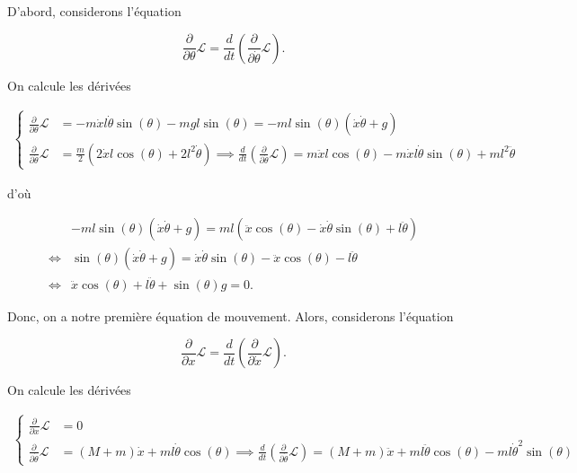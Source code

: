 \documentclass[french]{article}
\begin{document}
	D'abord, considerons l'équation
	
	\begin{equation}
		\frac{\partial}{\partial \theta} \mathcal{L} = \frac{d}{dt}\left( \frac{\partial}{\partial \dot{\theta}} \mathcal{L} \right).
	\end{equation}
	
	On calcule les dérivées
	
	\begin{align}
		\begin{cases}
		\frac{\partial}{\partial \theta} \mathcal{L} &= -m\dot{x} l \dot{\theta} \sin(\theta) - m g l \sin(\theta) = -ml\sin(\theta)(\dot{x} \dot{\theta} + g)\\
		\frac{\partial}{\partial \dot{\theta}} \mathcal{L} &= \frac{m}{2} (2\dot{x}l\cos(\theta) + 2l^2\dot{\theta}) \implies \frac{d}{dt}\left( \frac{\partial}{\partial \dot{\theta}} \mathcal{L} \right) = m\ddot{x}l\cos(\theta) - m\dot{x}l\dot{\theta}\sin(\theta) + ml^2\ddot{\theta}
		\end{cases}
	\end{align}
	
	d'où
	
	\begin{align}
	&-ml \sin(\theta)(\dot{x}\dot{\theta} + g) = ml(\ddot{x} \cos(\theta) - \dot{x}\dot{\theta} \sin(\theta) + l\ddot{\theta})\\
	\iff &\sin(\theta)(\dot{x}\dot{\theta} + g) = \dot{x}\dot{\theta} \sin(\theta) - \ddot{x} \cos(\theta) - l\ddot{\theta}\\
	\iff & \ddot{x} \cos(\theta) + l\ddot{\theta} + \sin(\theta)g = 0.
	\end{align}
	
	Donc, on a notre première équation de mouvement. Alors, considerons l'équation
	
	\begin{equation}
		\frac{\partial}{\partial x} \mathcal{L} = \frac{d}{dt}\left( \frac{\partial}{\partial \dot{x}} \mathcal{L} \right).
	\end{equation}
	
	On calcule les dérivées
	
	\begin{align}
	\begin{cases}
	\frac{\partial}{\partial x} \mathcal{L} &= 0\\
	\frac{\partial}{\partial \dot{\theta}} \mathcal{L} &= (M+m)\dot{x} + ml\dot{\theta}\cos(\theta)  \implies \frac{d}{dt}\left( \frac{\partial}{\partial \dot{\theta}} \mathcal{L} \right) = (M+m)\ddot{x} + ml\ddot{\theta}\cos(\theta) - ml\dot{\theta}^2\sin(\theta)
	\end{cases}
	\end{align}
	
\end{document}
